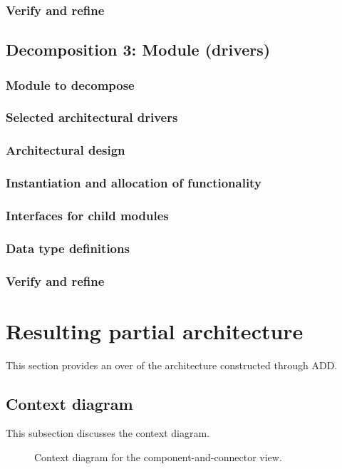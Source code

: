 \documentclass[a4paper,10pt]{article}
\begin{document}
\subsubsection{Verify and refine}

\subsection{Decomposition 3: Module (drivers)}
\subsubsection{Module to decompose}
\subsubsection{Selected architectural drivers}
\subsubsection{Architectural design}
\subsubsection{Instantiation and allocation of functionality}
\subsubsection{Interfaces for child modules}
\subsubsection{Data type definitions}
\subsubsection{Verify and refine}

\section{Resulting partial architecture}\label{sec:architecture}
This section provides an over of the architecture constructed through ADD\@.

\subsection{Context diagram}
This subsection discusses the context diagram.

\begin{figure}[!htp]
    \centering
    \caption{Context diagram for the component-and-connector view.
        }\label{fig:cc_context}
\end{figure}
\end{document}
